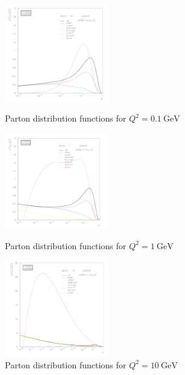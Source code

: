 


\begin{figure}
  \centering
  \includegraphics[width=0.4\textwidth]{Ett1.png}
  \caption*{Parton distribution functions for $Q^2= \SI{0.1}{\giga\electronvolt}$}
  \includegraphics[width=0.4\textwidth]{Ett2.png}
  \caption*{Parton distribution functions for $Q^2= \SI{1}{\giga\electronvolt}$}
  \includegraphics[width=0.4\textwidth]{Ett3.png}
  \caption*{Parton distribution functions for $Q^2= \SI{10}{\giga\electronvolt}$}
\end{figure}


